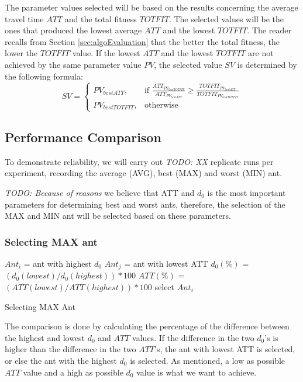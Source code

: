 The parameter values selected will be based on the results concerning the average travel time $ATT$ and the total fitness $TOTFIT$. The selected values will be the ones that produced the lowest average $ATT$ and the lowest $TOTFIT$. The reader recalls from Section \vref{sec:algoEvaluation} that the better the total fitness, the lower the $TOTFIT$ value. If the lowest $ATT$ and the lowest $TOTFIT$ are not achieved by the same parameter value $PV$, the selected value $SV$ is determined by the following formula:
\[
    SV= 
\begin{cases}
    PV_{bestATT},& \text{if } \frac{ATT_{PV_{bestTOTFIT}}}{ATT_{PV_{bestATT}}}\geq \frac{TOTFIT_{PV_{bestATT}}}{TOTFIT_{PV_{bestTOTFIT}}}\\
    PV_{bestTOTFIT},& \text{otherwise}
\end{cases}
\]


\subsection{Performance Comparison}

To demonstrate reliability, we will carry out \emph{\color{blue} TODO: XX } replicate runs per experiment, recording the average (AVG), best (MAX) and worst (MIN) ant.  

\emph{\color{blue} TODO: Because of reasons }we believe that ATT and $d_0$ is the most important parameters for determining best and worst ants, therefore, the selection of the MAX and MIN ant will be selected based on these parameters. 

\subsubsection{Selecting MAX ant}
\begin{algorithm}[H]
$Ant_{i}$ = ant with highest $d_0$\;
$Ant_{j}$ = ant with lowest ATT\;
{
	$d_0(\%)$ = $(d_0(lowest) / d_0(highest))*100$\;
	$ATT(\%)$ = $(ATT(lowest) / ATT(highest))*100$\;
	{
		select $Ant_{i}$
	}
}
 \caption{Selecting MAX Ant}
\end{algorithm}


The comparison is done by calculating the percentage of the difference between the highest and lowest $d_0$ and $ATT$ values. If the difference in the two $d_0$'s is higher than the difference in the two $ATT$'s, the ant with lowest ATT is selected, or else the ant with the highest $d_0$ is selected. As mentioned, a low as possible $ATT$ value and a high as possible $d_0$ value is what we want to achieve.

